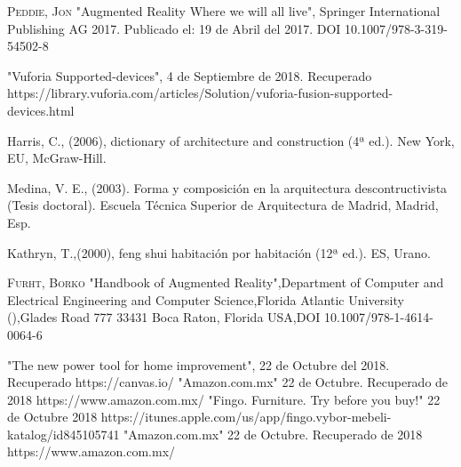 \begin{thebibliography}{X}
     \textsc{Peddie, Jon} "Augmented Reality Where we will all live", Springer International Publishing AG 2017. Publicado el: 19 de Abril del 2017. DOI 10.1007/978-3-319-54502-8 
	
	 "Vuforia Supported-devices", 4 de Septiembre de 2018. Recuperado
	https://library.vuforia.com/articles/Solution/vuforia-fusion-supported-devices.html
	
	 Harris, C., (2006), dictionary of architecture and construction (4ª ed.). New York, EU, McGraw-Hill.
	
	 Medina, V. E., (2003). Forma y composición en la arquitectura descontructivista (Tesis doctoral). Escuela Técnica Superior de Arquitectura de Madrid, Madrid, Esp.
	
	 Kathryn, T.,(2000), feng shui habitación por habitación (12ª ed.). ES, Urano.
	
	 \textsc{Furht, Borko} "Handbook of Augmented Reality",Department of Computer and Electrical Engineering and Computer Science,Florida Atlantic University (),Glades Road 777 33431 Boca Raton, Florida USA,DOI 10.1007/978-1-4614-0064-6
	
	 "The new power tool for home improvement", 22 de Octubre del 2018. Recuperado https://canvas.io/
	 "Amazon.com.mx" 22 de Octubre. Recuperado  de  2018 https://www.amazon.com.mx/ 
	 "Fingo. Furniture. Try before you buy!" 22 de Octubre 2018 https://itunes.apple.com/us/app/fingo.vybor-mebeli-katalog/id845105741
	 "Amazon.com.mx" 22 de Octubre. Recuperado  de  2018 https://www.amazon.com.mx/ 
	
	
\end{thebibliography}
